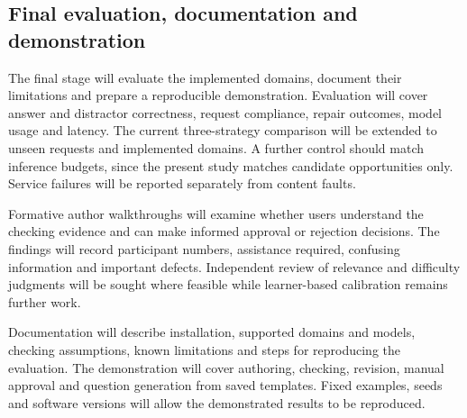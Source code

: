 \subsection{Final evaluation, documentation and demonstration}\label{sec:final-evaluation}

The final stage will evaluate the implemented domains, document their limitations and prepare a reproducible demonstration. Evaluation will cover answer and distractor correctness, request compliance, repair outcomes, model usage and latency. The current three-strategy comparison will be extended to unseen requests and implemented domains. A further control should match inference budgets, since the present study matches candidate opportunities only. Service failures will be reported separately from content faults.

Formative author walkthroughs will examine whether users understand the checking evidence and can make informed approval or rejection decisions. The findings will record participant numbers, assistance required, confusing information and important defects. Independent review of relevance and difficulty judgments will be sought where feasible while learner-based calibration remains further work.

Documentation will describe installation, supported domains and models, checking assumptions, known limitations and steps for reproducing the evaluation. The demonstration will cover authoring, checking, revision, manual approval and question generation from saved templates. Fixed examples, seeds and software versions will allow the demonstrated results to be reproduced.
